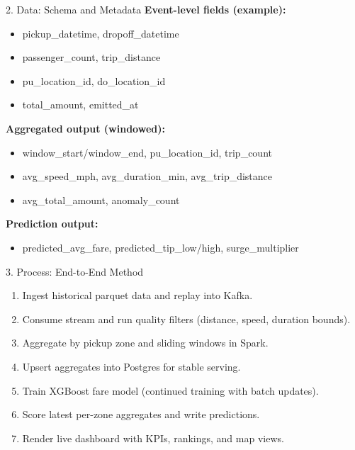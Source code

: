 \documentclass[aspectratio=169]{beamer}
\begin{document}
\begin{frame}{2. Data: Schema and Metadata}
\small
\textbf{Event-level fields (example):}
\begin{itemize}
  \item pickup\_datetime, dropoff\_datetime
  \item passenger\_count, trip\_distance
  \item pu\_location\_id, do\_location\_id
  \item total\_amount, emitted\_at
\end{itemize}

\textbf{Aggregated output (windowed):}
\begin{itemize}
  \item window\_start/window\_end, pu\_location\_id, trip\_count
  \item avg\_speed\_mph, avg\_duration\_min, avg\_trip\_distance
  \item avg\_total\_amount, anomaly\_count
\end{itemize}

\textbf{Prediction output:}
\begin{itemize}
  \item predicted\_avg\_fare, predicted\_tip\_low/high, surge\_multiplier
\end{itemize}
\end{frame}

\begin{frame}{3. Process: End-to-End Method}
\begin{enumerate}
  \item Ingest historical parquet data and replay into Kafka.
  \item Consume stream and run quality filters (distance, speed, duration bounds).
  \item Aggregate by pickup zone and sliding windows in Spark.
  \item Upsert aggregates into Postgres for stable serving.
  \item Train XGBoost fare model (continued training with batch updates).
  \item Score latest per-zone aggregates and write predictions.
  \item Render live dashboard with KPIs, rankings, and map views.
\end{enumerate}
\end{frame}
\end{document}
